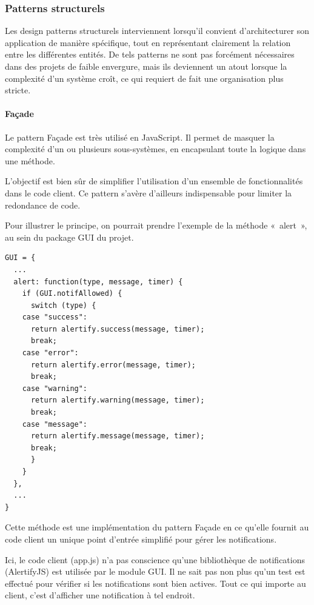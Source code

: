 \documentclass[a4paper,12pt]{article}
\begin{document}
\newpage

\subsubsection{Patterns structurels}

Les design patterns structurels interviennent lorsqu'il convient d'architecturer son application de manière spécifique, tout en représentant clairement la relation entre les différentes entités. De tels patterns ne sont pas forcément nécessaires dans des projets de faible envergure, mais ils deviennent un atout lorsque la complexité d'un système croît, ce qui requiert de fait une organisation plus stricte.

\paragraph{Façade}

Le pattern Façade est très utilisé en JavaScript. Il permet de masquer la complexité d'un ou plusieurs sous-systèmes, en encapsulant toute la logique dans une méthode.

L'objectif est bien sûr de simplifier l'utilisation d'un ensemble de fonctionnalités dans le code client. Ce pattern s'avère d'ailleurs indispensable pour limiter la redondance de code.

Pour illustrer le principe, on pourrait prendre l'exemple de la méthode «~alert~», au sein du package GUI du projet.

\newpage

\begin{lstlisting}
GUI = {
  ...
  alert: function(type, message, timer) {
    if (GUI.notifAllowed) {
      switch (type) {
	case "success":
	  return alertify.success(message, timer);
	  break;
	case "error":
	  return alertify.error(message, timer);
	  break;
	case "warning":
	  return alertify.warning(message, timer);
	  break;
	case "message":
	  return alertify.message(message, timer);
	  break;
      }
    }
  },
  ...
}
\end{lstlisting}

Cette méthode est une implémentation du pattern Façade en ce qu'elle fournit au code client un unique point d'entrée simplifié pour gérer les notifications.

Ici, le code client (app.js) n'a pas conscience qu'une bibliothèque de notifications (AlertifyJS) est utilisée par le module GUI. Il ne sait pas non plus qu'un test est effectué pour vérifier si les notifications sont bien actives. Tout ce qui importe au client, c'est d'afficher une notification à tel endroit.
\end{document}
